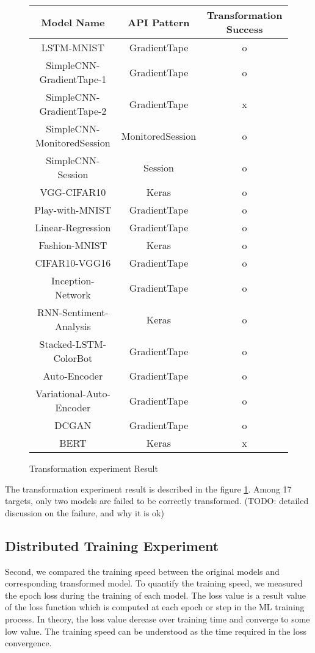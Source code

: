 \begin{figure}[!ht]
  \begin{center}
  \begin{tabular}{|c|c|c|}
    \hline
    Model Name & API Pattern & Transformation Success \\
    \hline
    LSTM-MNIST & GradientTape & o \\
    SimpleCNN-GradientTape-1 & GradientTape & o\\
    SimpleCNN-GradientTape-2 & GradientTape & x \\
    SimpleCNN-MonitoredSession & MonitoredSession &o\\
    SimpleCNN-Session & Session & o\\
    VGG-CIFAR10 & Keras & o \\ 
    Play-with-MNIST & GradientTape & o \\
    Linear-Regression & GradientTape & o \\
    Fashion-MNIST & Keras & o \\
    CIFAR10-VGG16 & GradientTape & o\\
    Inception-Network & GradientTape & o \\
    RNN-Sentiment-Analysis & Keras & o \\
    Stacked-LSTM-ColorBot & GradientTape & o \\
    Auto-Encoder & GradientTape & o \\
    Variational-Auto-Encoder & GradientTape & o \\
    DCGAN & GradientTape & o \\
    BERT & Keras & x \\
    \hline
  \end{tabular}
  \end{center}
  \caption{Transformation experiment Result}
  \label{fig:eval:trans}
\end{figure}

The transformation experiment result is described in the 
figure \ref{fig:eval:trans}. Among 17 targets, only two models are failed to
be correctly transformed.
(TODO: detailed discussion on the failure, and why it is ok)

\subsection{Distributed Training Experiment}

Second, we compared the training speed between the original models and
corresponding transformed model. 
To quantify the training speed, we measured the epoch loss during the training
of each model.
The loss value is a result value of the loss function which is computed
at each epoch or step in the ML training process.
In theory, the loss value derease over training time and converge
to some low value.
The training speed can be understood as the time required in the
loss convergence.

